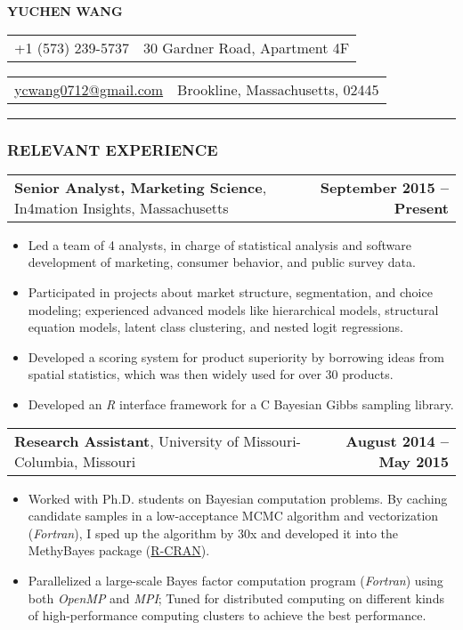 \documentclass[11pt]{article}
\makeatletter
\newcommand{\headerrow}[2]
{\begin{tabular*}{\linewidth}{l@{\extracolsep{\fill}}r}
	#1 & #2 \\
\end{tabular*}
}
\newcommand{\CPP}
{C\nolinebreak[4]\hspace{0em}\raisebox{.12ex}{\footnotesize\bf ++}}
\makeatother
\begin{document}
\begin{center}
	\huge\textbf{YUCHEN WANG}
\end{center}
\noindent\headerrow{+1 (573) 239-5737}{30 Gardner Road, Apartment 4F}
\headerrow{\href{mailto:ycwang0712@gmail.com}{ycwang0712@gmail.com}}{Brookline, Massachusetts, 02445}

\vspace{-.8em}
\hrule


\subsubsection*{\centering RELEVANT EXPERIENCE}
\vspace{-.3em}


\headerrow
{\textbf{Senior Analyst, Marketing Science}, In4mation Insights, Massachusetts}
{\textbf{September 2015 – Present}}
\begin{itemize}
		\item Led a team of 4 analysts, in charge of statistical analysis and software development of marketing, consumer behavior, and public survey data.
		\item Participated in projects about market structure, segmentation, and choice modeling; experienced advanced models like hierarchical models, structural equation models, latent class clustering, and nested logit regressions.
    \item Developed a scoring system for product superiority by borrowing ideas from spatial statistics, which was then widely used for over 30 products.
    \item Developed an \emph{R} interface framework for a \CPP{} Bayesian Gibbs sampling library.
\end{itemize}



\noindent\headerrow
{\textbf{Research Assistant}, University of Missouri-Columbia, Missouri}
{\textbf{August 2014 – May 2015}}
\noindent\begin{itemize}
    \item Worked with Ph.D. students on Bayesian computation problems. By caching candidate samples in a low-acceptance MCMC algorithm and vectorization (\emph{Fortran}), I sped up the algorithm by 30x and developed it into the MethyBayes package (\href{https://cran.rstudio.com/web/packages/MethyBayes/index.html}{R-CRAN}).
    \item Parallelized a large-scale Bayes factor computation program (\emph{Fortran}) using both \emph{OpenMP} and \emph{MPI}; Tuned for distributed computing on different kinds of high-performance computing clusters to achieve the best performance.
\end{itemize}
\end{document}
